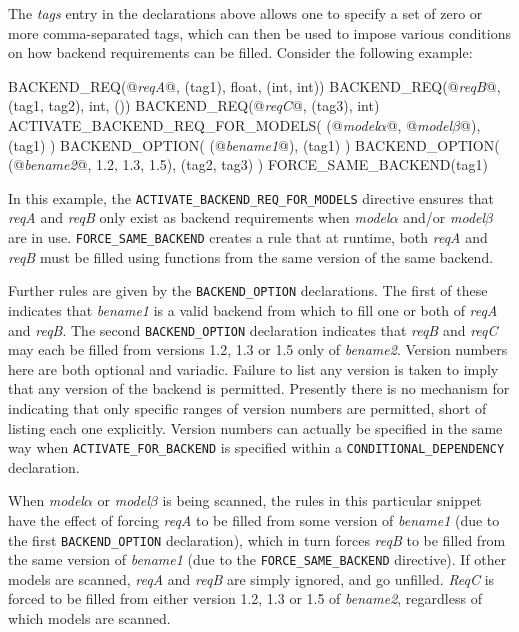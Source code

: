 \documentclass[pdftex,twocolumn,epjc3_preprint,runningheads]{svjour3}
\renewcommand{\_}{\discretionary{\underscore}{}{\underscore}}
\newcommand{\metavarf}[1]{\textit{\color{darkgreen}\footnotesize\textrm{#1}}}
\newcommand{\metavar}{\metavarf}
\begin{document}
The \metavar{tags} entry in the declarations above allows one to specify a set of zero or more comma-separated tags, which can then be used to impose various conditions on how backend requirements can be filled.  Consider the following example:
\begin{lstcpp}
BACKEND_REQ(@\metavar{req\_A}@, (tag1), float, (int, int))
BACKEND_REQ(@\metavar{req\_B}@, (tag1, tag2), int, ())
BACKEND_REQ(@\metavar{req\_C}@, (tag3), int)
ACTIVATE_BACKEND_REQ_FOR_MODELS( (@\metavar{model\_$\alpha$}@,
 @\metavar{model\_$\beta$}@), (tag1) )
BACKEND_OPTION( (@\metavar{be\_name1}@), (tag1) )
BACKEND_OPTION( (@\metavar{be\_name2}@, 1.2, 1.3, 1.5),
 (tag2, tag3) )
FORCE_SAME_BACKEND(tag1)
\end{lstcpp}
In this example, the \lstinline{ACTIVATE_BACKEND_REQ_FOR_MODELS} directive ensures that \metavar{req\_A} and \metavar{req\_B} only exist as backend requirements when \metavar{model\_$\alpha$} and/or \metavar{model\_$\beta$} are in use.  \lstinline{FORCE_SAME_BACKEND} creates a rule that at runtime, both \metavar{req\_A} and \metavar{req\_B} must be filled using functions from the same version of the same backend.

Further rules are given by the \lstinline{BACKEND_OPTION} declarations.  The first of these indicates that \metavar{be\_name1} is a valid backend from which to fill one or both of \metavar{req\_A} and \metavar{req\_B}.  The second \lstinline{BACKEND_OPTION} declaration indicates that \metavar{req\_B} and \metavar{req\_C} may each be filled from versions 1.2, 1.3 or 1.5 only of \metavar{be\_name2}.  Version numbers here are both optional and variadic. Failure to list any version is taken to imply that any version of the backend is permitted.  Presently there is no mechanism for indicating that only specific ranges of version numbers are permitted, short of listing each one explicitly.  Version numbers can actually be specified in the same way when \lstinline{ACTIVATE_FOR_BACKEND} is specified within a \lstinline{CONDITIONAL_DEPENDENCY} declaration.

When \metavar{model\_$\alpha$} or \metavar{model\_$\beta$} is being scanned, the rules in this particular snippet have the effect of forcing \metavar{req\_A} to be filled from some version of \metavar{be\_name1} (due to the first \lstinline{BACKEND_OPTION} declaration), which in turn forces \metavar{req\_B} to be filled from the same version of \metavar{be\_name1} (due to the \lstinline{FORCE_SAME_BACKEND} directive).  If other models are scanned, \metavar{req\_A} and \metavar{req\_B} are simply ignored, and go unfilled. \metavar{Req\_C} is forced to be filled from either version 1.2, 1.3 or 1.5 of \metavar{be\_name2}, regardless of which models are scanned.
\end{document}
